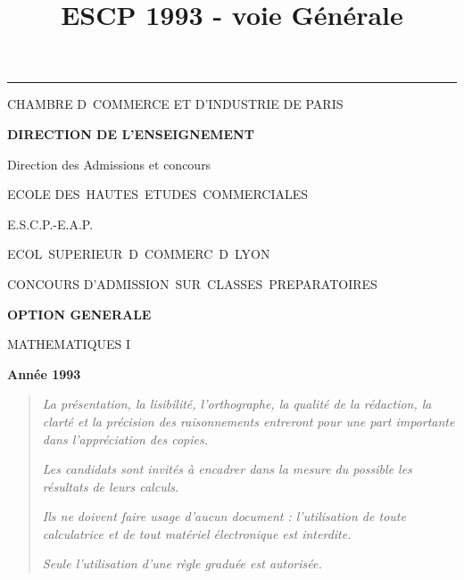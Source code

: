 \documentclass[11pt]{article}%
\title{\bf \vspace{-2cm} ESCP 1993 - voie Générale} %
\author{} %
\date{} %
\begin{document}
\maketitle %
\vspace{-1.4cm}\hrule %
\thispagestyle{fancy}

\vspace*{.2cm}




\begin{center}
{\small CHAMBRE D\E\ COMMERCE ET D'INDUSTRIE DE PARIS}

\textbf{DIRECTION DE L'ENSEIGNEMENT}

Direction des Admissions et concours

\underline{\hspace*{3cm}}

{\Large ECOLE DES\ HAUTES\ ETUDES\ COMMERCIALES}

{\Large E.S.C.P.-E.A.P.}

{\Large ECOL\E\ SUPERIEUR\E\ D\E\ COMMERC\E\ D\E\ LYON}{\large }

CONCOURS D'ADMISSION\ SUR\ CLASSES\ PREPARATOIRES

\underline{\hspace*{3cm}}

\textbf{OPTION GENERALE}

{\Large MATHEMATIQUES I}

\textbf{Année 1993}

\underline{\hspace*{3cm}}
\end{center}

\begin{quotation}
\noindent \textsl{La présentation, la lisibilité, l'orthographe, la
qualité
de la rédaction, la clarté et la précision des raisonnements entreront
pour
une part importante dans l'appréciation des copies.}

\noindent \textsl{Les candidats sont invités à encadrer dans la mesure
du
possible les résultats de leurs calculs.}

\noindent \textsl{Ils ne doivent faire usage d'aucun document :
l'utilisation de toute calculatrice et de tout matériel électronique
est
interdite.}

\noindent \textsl{Seule l'utilisation d'une règle graduée est
autorisée.}

\noindent \textsl{\hrulefill }
\end{quotation}
\end{document}
